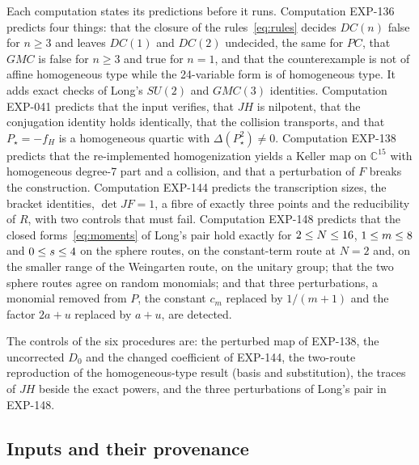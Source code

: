 \documentclass[11pt]{article}
\theoremstyle{remark}
\newcommand{\C}{\mathbb{C}}
\newcommand{\EXP}[1]{\mbox{EXP-#1}}
\begin{document}
Each computation states its predictions before it runs. Computation \EXP{136} predicts four things: that the closure of the rules~\eqref{eq:rules} decides $DC(n)$ false for $n\ge3$ and leaves $DC(1)$ and $DC(2)$ undecided, the same for $PC$, that $GMC$ is false for $n\ge3$ and true for $n=1$, and that the counterexample is not of affine homogeneous type while the 24-variable form is of homogeneous type. It adds exact checks of Long's $SU(2)$ and $GMC(3)$ identities. Computation \EXP{041} predicts that the input verifies, that $JH$ is nilpotent, that the conjugation identity holds identically, that the collision transports, and that $P_\star=-f_H$ is a homogeneous quartic with $\Delta(P_\star^2)\ne0$. Computation \EXP{138} predicts that the re-implemented homogenization yields a Keller map on $\C^{15}$ with homogeneous degree-7 part and a collision, and that a perturbation of $F$ breaks the construction. Computation \EXP{144} predicts the transcription sizes, the bracket identities, $\det JF=1$, a fibre of exactly three points and the reducibility of $R$, with two controls that must fail. Computation \EXP{148} predicts that the closed forms~\eqref{eq:moments} of Long's pair hold exactly for $2\le N\le16$, $1\le m\le8$ and $0\le s\le4$ on the sphere routes, on the constant-term route at $N=2$ and, on the smaller range of the Weingarten route, on the unitary group; that the two sphere routes agree on random monomials; and that three perturbations, a monomial removed from $P$, the constant $c_m$ replaced by $1/(m+1)$ and the factor $2a+u$ replaced by $a+u$, are detected.

The controls of the six procedures are: the perturbed map of \EXP{138}, the uncorrected $D_0$ and the changed coefficient of \EXP{144}, the two-route reproduction of the homogeneous-type result (basis and substitution), the traces of $JH$ beside the exact powers, and the three perturbations of Long's pair in \EXP{148}.

\subsection{Inputs and their provenance}\label{sec:inputs}
\end{document}
